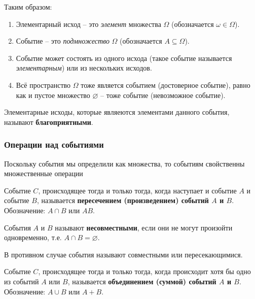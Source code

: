\begin{notice}Таким образом:

\begin{enumerate}
    \item Элементарный исход -- это \textit{элемент} множества $\Omega$ (обозначается $\omega \in \Omega$).
    \item Событие -- это \textit{подмножество} $\Omega$ (обозначается $A \subseteq \Omega$).
    \item Событие может состоять из одного исхода (такое событие называется \textit{элементарным}) или из нескольких исходов.
    \item Всё пространство $\Omega$ тоже является событием (достоверное событие), равно как и пустое множество $\varnothing$ -- тоже событие (невозможное событие).
\end{enumerate}
\end{notice}

Элементарные исходы, которые являеются элементами данного события,
называют \textbf{благоприятными}.

\subsubsection{Операции над событиями}

Поскольку события мы определили как множества, то событиям свойственны множественные операции

\begin{definition}
Событие $C$, происходящее тогда и только тогда, когда наступает и событие $A$ и событие $B$, называется \textbf{пересечением (произведением) событий $A$ и $B$}. Обозначение: $A \cap B$ или $AB$.
\end{definition}

\begin{definition}
События $A$ и $B$ называют \textbf{несовместными}, если они не могут произойти одновременно, т.е. $A \cap B = \varnothing$.
\end{definition}

В противном случае события называют совместными или пересекающимися.

\begin{definition}
Событие $C$, происходящее тогда и только тогда, когда происходит хотя бы одно из событий $A$ или $B$, называется \textbf{объединением (суммой) событий $A$ и $B$}. Обозначение: $A \cup B$ или $A + B$.
\end{definition}

